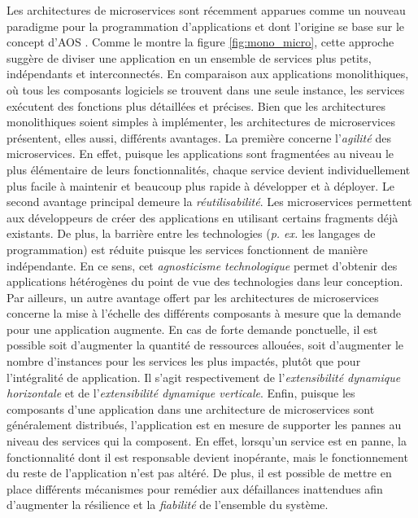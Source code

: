Les architectures de microservices sont récemment apparues comme un nouveau paradigme pour la programmation d'applications et dont l'origine se base sur le concept d'\ac{AOS} \citep{MacKenzie2006}. Comme le montre la figure \ref{fig:mono_micro}, cette approche suggère de diviser une application en un ensemble de services plus petits, indépendants et interconnectés. En comparaison aux applications monolithiques, où tous les composants logiciels se trouvent dans une seule instance, les services exécutent des fonctions plus détaillées et précises. Bien que les architectures monolithiques soient simples à implémenter, les architectures de microservices présentent, elles aussi, différents avantages. La première concerne l'\emph{agilité} des microservices. En effet, puisque les applications sont fragmentées au niveau le plus élémentaire de leurs fonctionnalités, chaque service devient individuellement plus facile à maintenir et beaucoup plus rapide à développer et à déployer. Le second avantage principal demeure la \emph{réutilisabilité}. Les microservices permettent aux développeurs de créer des applications en utilisant certains fragments déjà existants. De plus, la barrière entre les technologies (\textit{p. ex.} les langages de programmation) est réduite puisque les services fonctionnent de manière indépendante. En ce sens, cet \emph{agnosticisme technologique} permet d'obtenir des applications hétérogènes du point de vue des technologies dans leur conception. Par ailleurs, un autre avantage offert par les architectures de microservices concerne la mise à l'échelle des différents composants à mesure que la demande pour une application augmente. En cas de forte demande ponctuelle, il est possible soit d'augmenter la quantité de ressources allouées, soit d'augmenter le nombre d'instances pour les services les plus impactés, plutôt que pour l'intégralité de application. Il s'agit respectivement de l'\emph{extensibilité dynamique horizontale} et de l'\emph{extensibilité dynamique verticale}. Enfin, puisque les composants d'une application dans une architecture de microservices sont généralement distribués, l'application est en mesure de supporter les pannes au niveau des services qui la composent. En effet, lorsqu'un service est en panne, la fonctionnalité dont il est responsable devient inopérante, mais le fonctionnement du reste de l'application n'est pas altéré. De plus, il est possible de mettre en place différents mécanismes pour remédier aux défaillances inattendues afin d'augmenter la résilience et la \emph{fiabilité} de l'ensemble du système.

